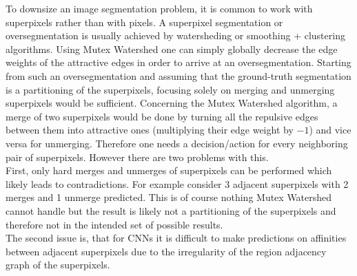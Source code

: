 To downsize an image segmentation problem, it is common to work with superpixels \cite{10.1007/978-3-642-23094-3_3} rather than  with pixels. A superpixel segmentation or oversegmentation is usually achieved by watersheding or smoothing + clustering algorithms.
Using Mutex Watershed one can simply globally decrease the edge weights of the attractive edges in order to arrive at an oversegmentation.
Starting from such an oversegmentation and assuming that the ground-truth segmentation is a partitioning of the superpixels, focusing solely on merging and unmerging superpixels would be sufficient. Concerning the Mutex Watershed algorithm, a merge of two superpixels would be done by turning all the repulsive edges between them into attractive ones (multiplying their edge weight by $-1$) and vice versa for unmerging. Therefore one needs a decision/action for every neighboring pair of superpixels. However there are two problems with this.\\
First, only hard merges and unmerges of superpixels can be performed which likely leads to contradictions. For example consider 3 adjacent superpixels with 2 merges and 1 unmerge predicted. This is of course nothing Mutex Watershed cannot handle but the result is likely not a partitioning of the superpixels and therefore not in the intended set of possible results.\\
The second issue is, that for CNNs it is difficult to make predictions on affinities between adjacent superpixels due to the irregularity of the region adjacency graph of the superpixels.